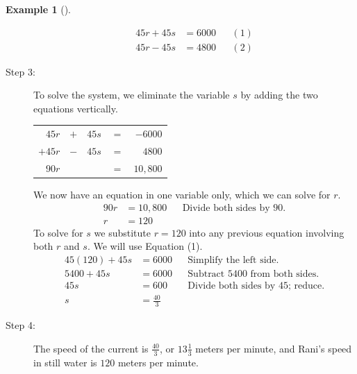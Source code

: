 \documentclass[10pt,]{book}
\theoremstyle{plain}
\theoremstyle{definition}
\theoremstyle{definition}
\newtheorem{example}[theorem]{Example}
\theoremstyle{definition}
\theoremstyle{definition}
\numberwithin{equation}{section}
\newcommand{\hrulethin}  {\noalign{\hrule height 0.04em}}
\newcommand{\amp}{ & }
\begin{document}
\begin{example}[]
\begin{description}
\begin{align*}
						45r + 45s \amp = 6000 \amp\amp(1)
					\\

						45r − 45s \amp = 4800 \amp\amp(2)
					
\end{align*}
\item[Step 3:]{}
				To solve the system, we eliminate the variable \(s\) by adding the two equations vertically.
				\leavevmode%
\begin{table}
\centering
\begin{tabular}{rrrrr}
\(45r\)&\(+\)&\(45s\)&\(=\)&\(-6000\)\tabularnewline[0pt]
\(+45r\)&\(-\)&\(45s\)&\(=\)&\(4800\)\tabularnewline\hrulethin
\(90r\)&\(\)&\(\)&\(=\)&\(10,800\)
\end{tabular}
\end{table}

				We now have an equation in one variable only, which we can solve for \(r\).
				\begin{align*}

						90r \amp = 10,800\amp\amp\text{Divide both sides by 90.}
					\\

						r \amp = 120
					
\end{align*}
				To solve for \(s\) we substitute \(r = 120\) into any previous equation involving both \(r\) and \(s\). We will use Equation (1).
				\begin{align*}

						45(120) + 45s\amp = 6000 \amp\amp\text{Simplify the left side.}
					\\

						5400 + 45s \amp = 6000 \amp\amp\text{Subtract 5400 from both sides.}
					\\

						45s \amp = 600 \amp\amp\text{Divide both sides by 45; reduce.}
					\\

						s\amp = \frac{40}{3}
					
\end{align*}
\item[Step 4: ]{}
				The speed of the current is \(\frac{40}{3}\), or \(13\frac{1}{3} \) meters per minute, and Rani's speed in still water is \(120\) meters per minute.
\end{description}

\end{example}
\end{document}
